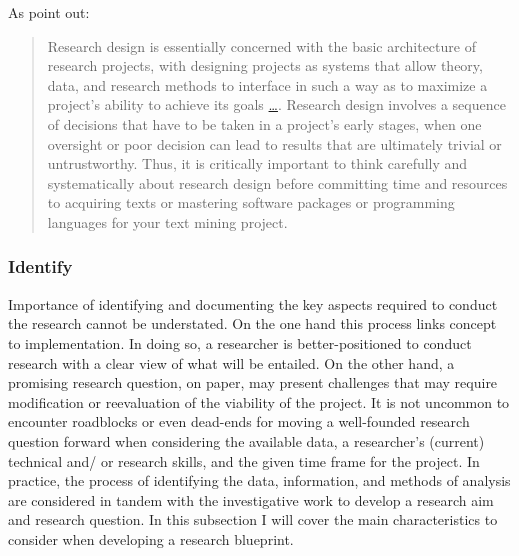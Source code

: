 \documentclass[
]{article}
\begin{document}
As \citet{Ignatow2017} point out:

\begin{quote}
Research design is essentially concerned with the basic architecture of research projects, with designing projects as systems that allow theory, data, and research methods to interface in such a way as to maximize a project's ability to achieve its goals \protect\hyperlink{section-1}{\ldots{}}. Research design involves a sequence of decisions that have to be taken in a project's early stages, when one oversight or poor decision can lead to results that are ultimately trivial or untrustworthy. Thus, it is critically important to think carefully and systematically about research design before committing time and resources to acquiring texts or mastering software packages or programming languages for your text mining project.
\end{quote}

\hypertarget{identify}{%
\subsubsection{Identify}\label{identify}}

Importance of identifying and documenting the key aspects required to conduct the research cannot be understated. On the one hand this process links concept to implementation. In doing so, a researcher is better-positioned to conduct research with a clear view of what will be entailed. On the other hand, a promising research question, on paper, may present challenges that may require modification or reevaluation of the viability of the project. It is not uncommon to encounter roadblocks or even dead-ends for moving a well-founded research question forward when considering the available data, a researcher's (current) technical and/ or research skills, and the given time frame for the project. In practice, the process of identifying the data, information, and methods of analysis are considered in tandem with the investigative work to develop a research aim and research question. In this subsection I will cover the main characteristics to consider when developing a research blueprint.
\end{document}
